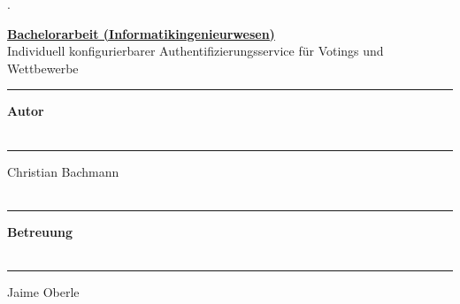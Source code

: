 \begin{titlepage}


\begin{minipage}[b]{0.117\textwidth}
\hskip 0.05cm
\end{minipage}
\begin{minipage}[b]{0.91\textwidth}
\begin{tiny}.\end{tiny}\vskip 2.8cm
	{\huge
	
	\textbf{\underline{Bachelorarbeit (Informatikingenieurwesen)}}\\
	
	Individuell konfigurierbarer Authentifizierungsservice für Votings und Wettbewerbe
	\vskip 3.5cm}
	
	\begin{minipage}[b]{0.27\textwidth}
	\hrule\vskip 0.5cm
		\textbf{Autor}\\
		\\
	\end{minipage}
	\begin{minipage}[b]{0.03\textwidth}
	\hskip 0.5cm
	\end{minipage}
	\begin{minipage}[b]{0.7\textwidth}
	\hrule\vskip 0.5cm
	    Christian Bachmann\\
	    \\
	\end{minipage}
	
	\begin{minipage}[b]{0.27\textwidth}
	\hrule\vskip 0.5cm
		\textbf{Betreuung}\\
		\\
	\end{minipage}
	\begin{minipage}[b]{0.03\textwidth}
	\hskip 0.5cm
	\end{minipage}
	\begin{minipage}[b]{0.7\textwidth}
	\hrule\vskip 0.5cm
		Jaime Oberle\\
		 \\
	
	\end{minipage}
	
	

\end{minipage}
\end{titlepage}
